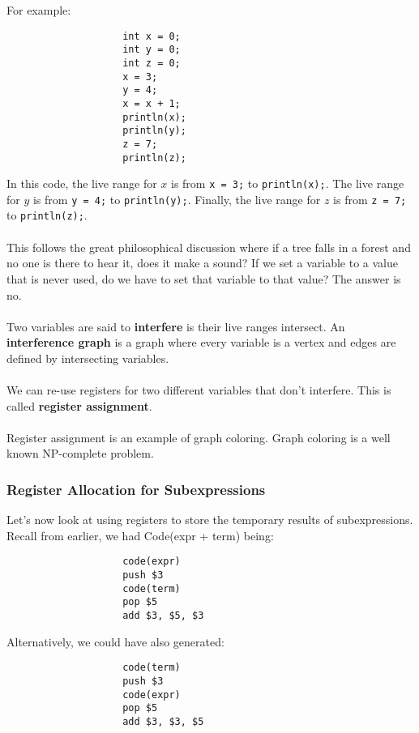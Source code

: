 \documentclass[]{article}
\theoremstyle{definition}
\begin{document}
				For example:
			
				\begin{verbatim}
					int x = 0;
					int y = 0;
					int z = 0;
					x = 3;
					y = 4;
					x = x + 1;
					println(x);
					println(y);
					z = 7;
					println(z);
				\end{verbatim}
			
				In this code, the live range for $x$ is from \verb|x = 3;| to \verb|println(x);|. The live range for $y$ is from \verb|y = 4;| to \verb|println(y);|. Finally, the live range for $z$ is from \verb|z = 7;| to \verb|println(z);|.
				\\ \\
				This follows the great philosophical discussion where if a tree falls in a forest and no one is there to hear it, does it make a sound? If we set a variable to a value that is never used, do we have to set that variable to that value? The answer is no.
				\\ \\
				Two variables are said to \textbf{interfere} is their live ranges intersect. An \textbf{interference graph} is a graph where every variable is a vertex and edges are defined by intersecting variables.
				\\ \\
				We can re-use registers for two different variables that don't interfere. This is called \textbf{register assignment}.
				\\ \\
				Register assignment is an example of graph coloring. Graph coloring is a well known NP-complete problem.
				
			\subsubsection{Register Allocation for Subexpressions}	
				Let's now look at using registers to store the temporary results of subexpressions. Recall from earlier, we had Code(expr + term) being:
				\begin{verbatim}
					code(expr)
					push $3
					code(term)
					pop $5
					add $3, $5, $3
				\end{verbatim}
			
				Alternatively, we could have also generated:
				\begin{verbatim}
					code(term)
					push $3
					code(expr)
					pop $5
					add $3, $3, $5
				\end{verbatim}
			
\end{document}
